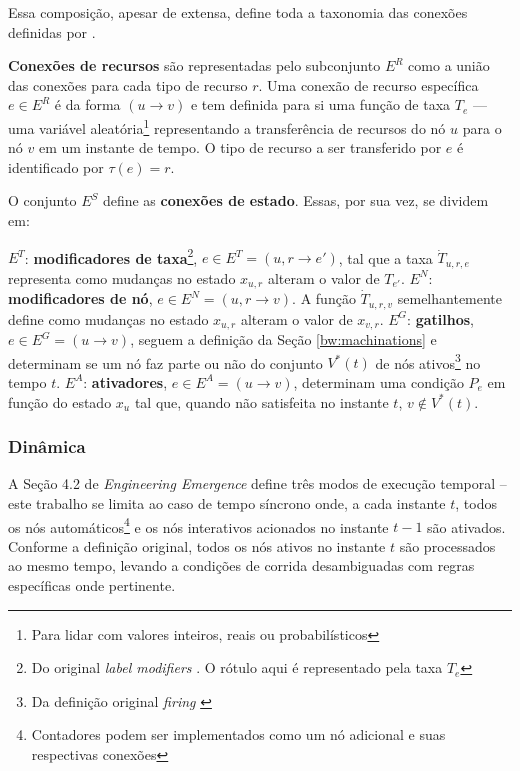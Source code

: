 \documentclass[10pt,a4paper]{article}
\newcommand{\note}[1]{
    \vspace{0.3cm}
    \colorbox{blue!30}{
            \begin{minipage}{0.4\textwidth}
		    \ttfamily \footnotesize
               #1
            \end{minipage}
        }
    \vspace{0.3cm}
}
\begin{document}
Essa composição, apesar de extensa, define toda a taxonomia das conexões definidas por \citeauthor{machinations}.

\textbf{Conexões de recursos} são representadas pelo subconjunto $E^R$ como a união das conexões para cada tipo de recurso $r$. Uma conexão de recurso específica $e \in E^R$ é da forma $(u \rightarrow v)$ e tem definida para si uma função de taxa $T_e$ --- uma variável aleatória\footnote{Para lidar com valores inteiros, reais ou probabilísticos} representando a transferência de recursos do nó $u$ para o nó $v$ em um instante de tempo. O tipo de recurso a ser transferido por $e$ é identificado por $\tau (e) = r$.

O conjunto $E^S$ define as \textbf{conexões de estado}. Essas, por sua vez, se dividem em:

\begin{outline}
    \1 $E^T$: \textbf{modificadores de taxa}\footnote{Do original \textit{label modifiers} \parencite{machinations}. O rótulo aqui é representado pela taxa $T_e$}, $e \in E^T = (u, r\rightarrow e')$, tal que a taxa $\dot{T}_{u,r,e}$ representa como mudanças no estado $x_{u, r}$ alteram o valor de $T_{e'}$.
    \1 $E^N$: \textbf{modificadores de nó}, $e \in E^N = (u, r \rightarrow v)$. A função $\dot{T}_{u,r,v}$ semelhantemente define como mudanças no estado $x_{u, r}$ alteram o valor de $x_{v, r}$.
    \1 $E^G$: \textbf{gatilhos}, $e \in E^G = (u \rightarrow v)$, seguem a definição da Seção \ref{bw:machinations} e determinam se um nó faz parte ou não do conjunto $V^*(t)$ de nós ativos\footnote{Da definição original \textit{firing} \parencite{machinations}} no tempo $t$. 
    \1 $E^A$: \textbf{ativadores}, $e \in E^A = (u \rightarrow v)$, determinam uma condição $P_e$ em função do estado $x_{u}$ tal que, quando não satisfeita no instante $t$, $v \notin V^*(t)$.
\end{outline}

\subsubsection{Dinâmica}
\label{m:modeling:dynamics}
A Seção 4.2 de \textit{Engineering Emergence} define três modos de execução temporal -- este trabalho se limita ao caso de tempo síncrono onde, a cada instante $t$, todos os nós automáticos\footnote{Contadores podem ser implementados como um nó adicional e suas respectivas conexões} e os nós interativos acionados no instante $t-1$ são ativados. Conforme a definição original, todos os nós ativos no instante $t$ são processados ao mesmo tempo, levando a condições de corrida desambiguadas com regras específicas onde pertinente.
\end{document}

